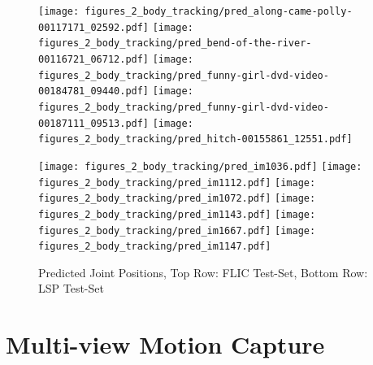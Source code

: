 \begin{figure}[th]
  \centering
      {\texttt{[image: figures\_2\_body\_tracking/pred\_along-came-polly-00117171\_02592.pdf]}}
      {\texttt{[image: figures\_2\_body\_tracking/pred\_bend-of-the-river-00116721\_06712.pdf]}}
      {\texttt{[image: figures\_2\_body\_tracking/pred\_funny-girl-dvd-video-00184781\_09440.pdf]}}
      {\texttt{[image: figures\_2\_body\_tracking/pred\_funny-girl-dvd-video-00187111\_09513.pdf]}}
      {\texttt{[image: figures\_2\_body\_tracking/pred\_hitch-00155861\_12551.pdf]}}

  \centering
      {\texttt{[image: figures\_2\_body\_tracking/pred\_im1036.pdf]}}
      {\texttt{[image: figures\_2\_body\_tracking/pred\_im1112.pdf]}}
      {\texttt{[image: figures\_2\_body\_tracking/pred\_im1072.pdf]}}
      {\texttt{[image: figures\_2\_body\_tracking/pred\_im1143.pdf]}}
      {\texttt{[image: figures\_2\_body\_tracking/pred\_im1667.pdf]}}
      {\texttt{[image: figures\_2\_body\_tracking/pred\_im1147.pdf]}}

  \caption{Predicted Joint Positions, Top Row: FLIC Test-Set, Bottom Row: LSP Test-Set}
  \label{fig:pics}
\end{figure}

\section{Multi-view Motion Capture}

